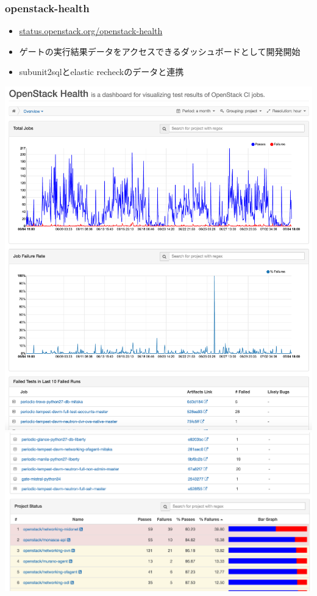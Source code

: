 \documentclass[aspectratio=169,11pt,hyperref={colorlinks=true}]{beamer}
\begin{document}
\begin{frame}
  \frametitle{openstack-health}
  \begin{itemize}
    \item \href{http://status.openstack.org/openstack-health/}{status.openstack.org/openstack-health}
    \item ゲートの実行結果データをアクセスできるダッシュボードとして開発開始
    \item subunit2sqlとelastic recheckのデータと連携
  \end{itemize}
  \begin{center}
    \includegraphics[height=0.6\textheight]{openstack-health-1.png}
    \includegraphics[height=0.6\textheight]{openstack-health-2.png}
  \end{center}
\end{frame}
\end{document}
